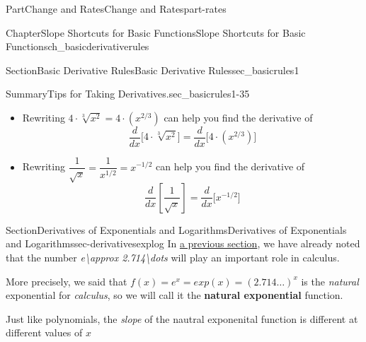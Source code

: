 \documentclass{tufte-book}
\newcommand{\terminology}[1]{\textbf{#1}}
\numberwithin{equation}{chapter}
\newcommand{\ddx}[1]{ \dfrac{d}{dx} \Big[ #1 \Big]  }
\newcommand{\ddxfrac}[1]{ \dfrac{d}{dx} \left[ #1 \right]  }
\begin{document}
\begin{partptx}{Part}{Change and Rates}{}{Change and Rates}{}{}{part-rates}
\begin{chapterptx}{Chapter}{Slope Shortcuts for Basic Functions}{}{Slope Shortcuts for Basic Functions}{}{}{ch_basicderivativerules}
\begin{sectionptx}{Section}{Basic Derivative Rules}{}{Basic Derivative Rules}{}{}{sec_basicrules1}
\begin{assemblage}{Summary}{Tips for Taking Derivatives.}{sec_basicrules1-35}
\begin{enumerate}
\begin{itemize}[label=\textbullet]
%
\item{}Rewriting \(4\cdot \sqrt[3]{x^2} = 4\cdot (x^{2/3}) \) can help you find the derivative of%
\begin{equation*}
\ddx{4\cdot \sqrt[3]{x^2}} = \ddx{4\cdot (x^{2/3})} 
\end{equation*}
%
\item{}Rewriting \(\dfrac{1}{\sqrt{x}} = \dfrac{1}{x^{1/2}}= x^{-1/2}\) can help you find the derivative of%
\begin{equation*}
\ddxfrac{\dfrac{1}{\sqrt{x}} } = \ddx{x^{-1/2} } 
\end{equation*}
%
\end{itemize}
\end{enumerate}
%
\end{assemblage}
\end{sectionptx}
%
%
\typeout{************************************************}
\typeout{************************************************}
%
\begin{sectionptx}{Section}{Derivatives of Exponentials and Logarithms}{}{Derivatives of Exponentials and Logarithms}{}{}{sec-derivativesexplog}
In \hyperlink{subsec-naturalexp}{a previous section}, we have already noted that the number \emph{e\textbackslash{}approx 2.714\textbackslash{}dots} will play an important role in calculus.%
\par
More precisely, we said that \(f(x) = e^x = exp(x) = (2.714\dots)^x \) is the \emph{natural} exponential for \emph{calculus}, so we will call it the \terminology{natural exponential} function.%
\par
Just like polynomials, the \emph{slope} of the nautral exponenital function is different at different values of \(x\) \begin{sidebyside}{2}{0.075}{0.075}{0.17}%
\begin{sbspanel}{0.47}%

\end{sbspanel}
\end{sidebyside}
\end{sectionptx}
\end{chapterptx}
\end{partptx}
\end{document}
